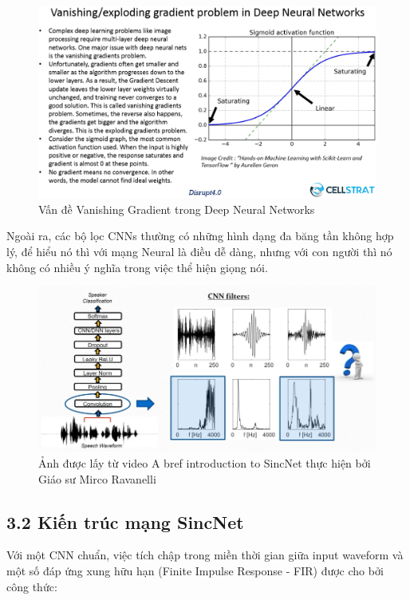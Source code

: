 \documentclass{article}
\begin{document}
	\begin{figure}[H]
		\centering
		\includegraphics[width=1\textwidth]{images/Vanishing-Gradients-in-DNN.png}
		\caption{Vấn đề Vanishing Gradient trong Deep Neural Networks}
		\label{fig:writing-thesis}
	\end{figure}
	Ngoài ra, các bộ lọc CNNs thường có những hình dạng đa băng tần không hợp lý, để hiểu nó thì với mạng Neural là điều dễ dàng, nhưng với con người thì nó không có nhiều ý nghĩa trong việc thể hiện giọng nói.
	\begin{figure}[H]
		\centering
		\includegraphics[width=1\textwidth]{images/interpretability_problems.png}
		\caption{Ảnh được lấy từ video A bref introduction to SincNet thực hiện bởi Giáo sư Mirco Ravanelli}
		\label{fig:writing-thesis}
	\end{figure}
	
	
	\subsection{3.2 Kiến trúc mạng SincNet}
	
	Với một CNN chuẩn, việc tích chập trong miền thời gian giữa input waveform và một số đáp ứng xung hữu hạn (Finite Impulse Response - FIR) được cho bởi công thức:
	
\end{document}
